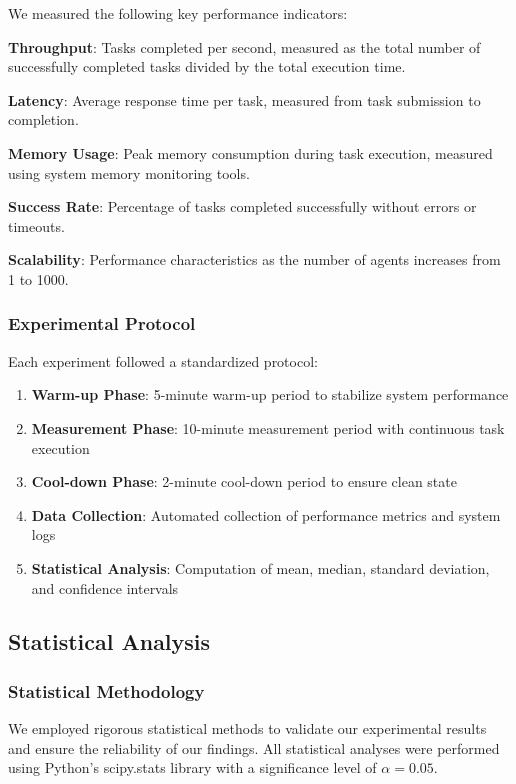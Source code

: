 \documentclass[conference]{IEEEtran}
\begin{document}
We measured the following key performance indicators:

\textbf{Throughput}: Tasks completed per second, measured as the total number of successfully completed tasks divided by the total execution time.

\textbf{Latency}: Average response time per task, measured from task submission to completion.

\textbf{Memory Usage}: Peak memory consumption during task execution, measured using system memory monitoring tools.

\textbf{Success Rate}: Percentage of tasks completed successfully without errors or timeouts.

\textbf{Scalability}: Performance characteristics as the number of agents increases from 1 to 1000.

\subsubsection{Experimental Protocol}

Each experiment followed a standardized protocol:

\begin{enumerate}
\item \textbf{Warm-up Phase}: 5-minute warm-up period to stabilize system performance
\item \textbf{Measurement Phase}: 10-minute measurement period with continuous task execution
\item \textbf{Cool-down Phase}: 2-minute cool-down period to ensure clean state
\item \textbf{Data Collection}: Automated collection of performance metrics and system logs
\item \textbf{Statistical Analysis}: Computation of mean, median, standard deviation, and confidence intervals
\end{enumerate}

\subsection{Statistical Analysis}

\subsubsection{Statistical Methodology}

We employed rigorous statistical methods to validate our experimental results and ensure the reliability of our findings. All statistical analyses were performed using Python's scipy.stats library with a significance level of $\alpha = 0.05$.
\end{document}
